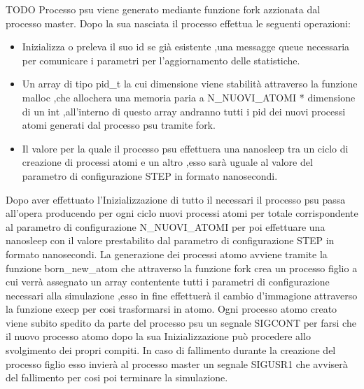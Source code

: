 TODO
Processo psu viene generato mediante funzione fork azzionata dal processo master.
Dopo la sua nasciata il processo effettua le seguenti operazioni:
\begin{itemize}
    \item Inizializza o preleva il suo id se già esistente ,una messagge queue necessaria per comunicare i parametri per l'aggiornamento delle statistiche. 
    \item Un array di tipo pid_t la cui dimensione viene stabilità attraverso la funzione malloc ,che allochera una memoria paria a N\_NUOVI\_ATOMI * dimensione di un int ,all'interno di questo array andranno tutti i pid dei nuovi processi atomi generati dal processo psu tramite fork. 
    \item Il valore per la quale il processo psu effettuera una nanosleep tra un ciclo di creazione di processi atomi e un altro ,esso sarà uguale al valore del parametro di configurazione STEP in formato nanosecondi.
\end{itemize}
Dopo aver effettuato l'Inizializzazione di tutto il necessari il processo psu passa all'opera producendo per ogni ciclo nuovi processi atomi per totale corrispondente al parametro di configurazione N\_NUOVI\_ATOMI per poi effettuare una nanosleep con il valore prestabilito dal parametro di configurazione STEP in formato nanosecondi.
La generazione dei processi atomo avviene tramite la funzione born_new_atom che attraverso la funzione fork crea un processo figlio a cui verrà assegnato un array contentente tutti i parametri di configurazione necessari alla simulazione ,esso in fine effettuerà il cambio d'immagione attraverso la funzione execp per cosi trasformarsi in atomo.
Ogni processo atomo creato viene subito spedito da parte del processo psu un segnale SIGCONT per farsi che il nuovo processo atomo dopo la sua Inizializzazione può procedere allo svolgimento dei propri compiti. 
In caso di fallimento durante la creazione del processo figlio esso invierà al processo master un segnale SIGUSR1 che avviserà del fallimento per cosi poi terminare la simulazione. 